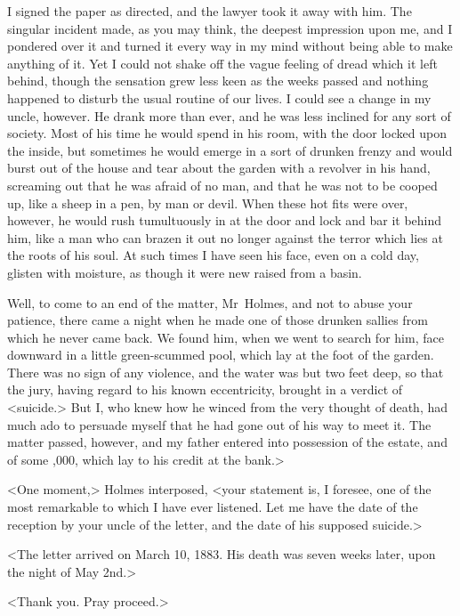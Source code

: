 I signed the paper as directed, and the lawyer took it away with him. The singular incident made, as you may think, the deepest impression upon me, and I pondered over it and turned it every way in my mind without being able to make anything of it. Yet I could not shake off the vague feeling of dread which it left behind, though the sensation grew less keen as the weeks passed and nothing happened to disturb the usual routine of our lives. I could see a change in my uncle, however. He drank more than ever, and he was less inclined for any sort of society. Most of his time he would spend in his room, with the door locked upon the inside, but sometimes he would emerge in a sort of drunken frenzy and would burst out of the house and tear about the garden with a revolver in his hand, screaming out that he was afraid of no man, and that he was not to be cooped up, like a sheep in a pen, by man or devil. When these hot fits were over, however, he would rush tumultuously in at the door and lock and bar it behind him, like a man who can brazen it out no longer against the terror which lies at the roots of his soul. At such times I have seen his face, even on a cold day, glisten with moisture, as though it were new raised from a basin.

Well, to come to an end of the matter, Mr~Holmes, and not to abuse your patience, there came a night when he made one of those drunken sallies from which he never came back. We found him, when we went to search for him, face downward in a little green-scummed pool, which lay at the foot of the garden. There was no sign of any violence, and the water was but two feet deep, so that the jury, having regard to his known eccentricity, brought in a verdict of <suicide.> But I, who knew how he winced from the very thought of death, had much ado to persuade myself that he had gone out of his way to meet it. The matter passed, however, and my father entered into possession of the estate, and of some ,000, which lay to his credit at the bank.>

<One moment,> Holmes interposed, <your statement is, I foresee, one of the most remarkable to which I have ever listened. Let me have the date of the reception by your uncle of the letter, and the date of his supposed suicide.>

<The letter arrived on March 10, 1883. His death was seven weeks later, upon the night of May 2nd.>

<Thank you. Pray proceed.>

